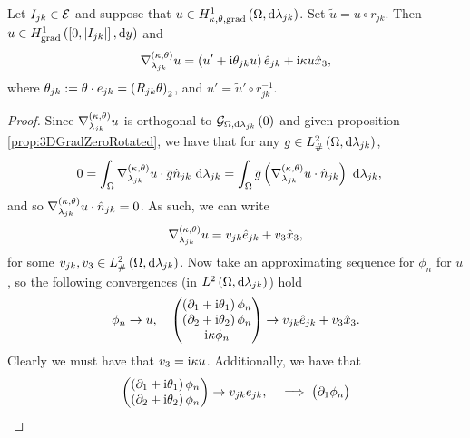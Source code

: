 \begin{cory} \label{cory:3DTangGradRotated}
	Let $I_{jk}\in\mathcal{E}$ and suppose that $u\in H^1_{\kappa,\theta,\mathrm{grad}}\left( \Omega, \mathrm{d}\lambda_{jk} \right)$.
	Set $\widetilde{u} = u\circ r_{jk}$.
	Then $u\in H^1_\mathrm{grad}\left( \left[ 0,\left\lvert I_{jk} \right\rvert \right], \mathrm{d}y \right)$ and 
	\begin{align*}
		\nabla^{\left( \kappa, \theta \right)}_{\lambda_{jk}}u = \left( u'+\mathrm{i}\theta_{jk}u \right)\hat{e}_{jk} + \mathrm{i}\kappa u\hat{x}_3,
	\end{align*}
	where $\theta_{jk}:=\theta\cdot e_{jk} = \left( R_{jk}\theta \right)_2$, and $u' = \widetilde{u}'\circ r_{jk}^{-1}$.
\end{cory}
\begin{proof}
	Since $\nabla^{\left( \kappa, \theta \right)}_{\lambda_{jk}}u$ is orthogonal to $\mathcal{G}_{ \Omega, \mathrm{d}\lambda_{jk}}\left( 0 \right)$ and given proposition \ref{prop:3DGradZeroRotated}, we have that for any $g\in L^2_{\#}\left( \Omega,\mathrm{d} \lambda_{jk} \right)$,
	\begin{align*}
		0 &= \int_{\Omega} \nabla^{\left( \kappa, \theta \right)}_{\lambda_{jk}}u \cdot \overline{g}\hat{n}_{jk}  \ \mathrm{d}\lambda_{jk}
		= \int_{\Omega} \overline{g}\left( \nabla^{\left( \kappa, \theta \right)}_{\lambda_{jk}}u\cdot\hat{n}_{jk} \right)  \ \mathrm{d}\lambda_{jk},
	\end{align*}
	and so $\nabla^{\left( \kappa, \theta \right)}_{\lambda_{jk}}u\cdot\hat{n}_{jk}=0$.
	As such, we can write
	\begin{align*}
		\nabla^{\left( \kappa, \theta \right)}_{\lambda_{jk}}u = v_{jk}\hat{e}_{jk} + v_3\hat{x}_3,
	\end{align*}
	for some $v_{jk},v_3\in L^2_{\#}\left( \Omega,\mathrm{d} \lambda_{jk} \right)$.
	Now take an approximating sequence for $\phi_n$ for $u$, so the following convergences (in $L^{2}\left( \Omega,\mathrm{d} \lambda_{jk} \right)$) hold
	\begin{align*}
		\phi_n \rightarrow u, \quad 
		\begin{pmatrix}
			\left(  \partial_1 + \mathrm{i}\theta_1  \right)\phi_n \\
			\left(  \partial_2 + \mathrm{i}\theta_2  \right)\phi_n \\
			\mathrm{i}\kappa\phi_n
		\end{pmatrix}
		\rightarrow v_{jk}\hat{e}_{jk} + v_3\hat{x}_3.
	\end{align*}
	Clearly we must have that $v_3 = \mathrm{i}\kappa u$.
	Additionally, we have that
	\begin{align*}
		\begin{pmatrix}
			\left(  \partial_1 + \mathrm{i}\theta_1  \right)\phi_n \\
			\left(  \partial_2 + \mathrm{i}\theta_2  \right)\phi_n
		\end{pmatrix}
		\rightarrow v_{jk}e_{jk},
		\quad \implies
		\begin{pmatrix}
			\partial_1\phi_n \\

\end{pmatrix}
\end{align*}
\end{proof}
